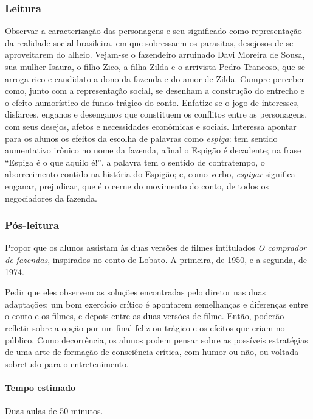 \documentclass[11pt]{extarticle}
\begin{document}
\subsubsection{Leitura}

Observar a caracterização das personagens e seu significado como
representação da realidade social brasileira, em que sobressaem os
parasitas, desejosos de se aproveitarem do alheio. Vejam-se o fazendeiro
arruinado Davi Moreira de Sousa, sua mulher Isaura, o filho Zico, a
filha Zilda e o arrivista Pedro Trancoso, que se arroga rico e candidato
a dono da fazenda e do amor de Zilda. Cumpre perceber como, junto com a
representação social, se desenham a construção do entrecho e o efeito
humorístico de fundo trágico do conto. Enfatize-se o jogo de interesses,
disfarces, enganos e desenganos que constituem os conflitos entre as
personagens, com seus desejos, afetos e necessidades econômicas e
sociais. Interessa apontar para os alunos os efeitos da escolha de
palavras como \emph{espiga}: tem sentido aumentativo irônico no nome da
fazenda, afinal o Espigão é decadente; na frase ``Espiga é o que aquilo
é!'', a palavra tem o sentido de contratempo, o aborrecimento contido na
história do Espigão; e, como verbo, \emph{espigar} significa enganar,
prejudicar, que é o cerne do movimento do conto, de todos os
negociadores da fazenda.

\subsubsection{Pós-leitura}

Propor que os alunos assistam às duas versões de filmes intitulados
\emph{O comprador de fazendas}, inspirados no conto de Lobato. A
primeira, de 1950, e a segunda, de 1974.

Pedir que eles observem as soluções encontradas pelo diretor nas duas
adaptações: um bom exercício crítico é apontarem semelhanças e
diferenças entre o conto e os filmes, e depois entre as duas versões de
filme. Então, poderão refletir sobre a opção por um final feliz ou
trágico e os efeitos que criam no público. Como decorrência, os alunos
podem pensar sobre as possíveis estratégias de uma arte de formação de
consciência crítica, com humor ou não, ou voltada sobretudo para o
entretenimento.

\paragraph{Tempo estimado} Duas aulas de 50 minutos.
\end{document}
